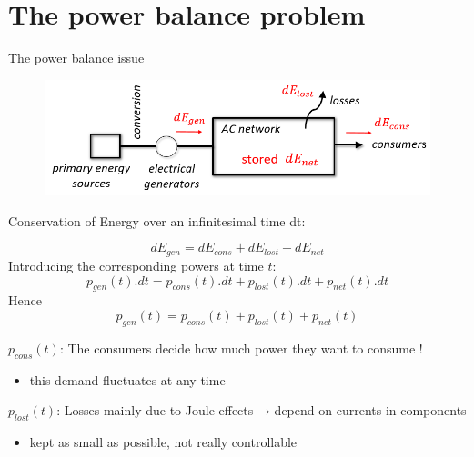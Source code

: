 \section{The power balance problem}

\begin{frame}[allowframebreaks]{The power balance issue}
\begin{figure}
\centering
\includegraphics[width=0.8\linewidth]{images/power_balance.png}
\end{figure}
Conservation of Energy over an infinitesimal time dt:

$$dE_{gen} = dE_{cons} + dE_{lost} + dE_{net}$$Introducing the corresponding powers at time $t$:$$p_{gen}(t).dt = p_{cons}(t).dt + p_{lost}(t).dt + p_{net}(t).dt$$Hence$$p_{gen}(t) = p_{cons}(t) + p_{lost}(t) + p_{net}(t)$$


$p_{cons}(t)$: The consumers decide how much power they want to consume !
\begin{itemize}
\item this demand fluctuates at any time
\end{itemize}
$p_{lost}(t)$: Losses mainly due to Joule effects → depend on currents in components
\begin{itemize}
\item kept as small as possible, not really controllable
\end{itemize}


\end{frame}

